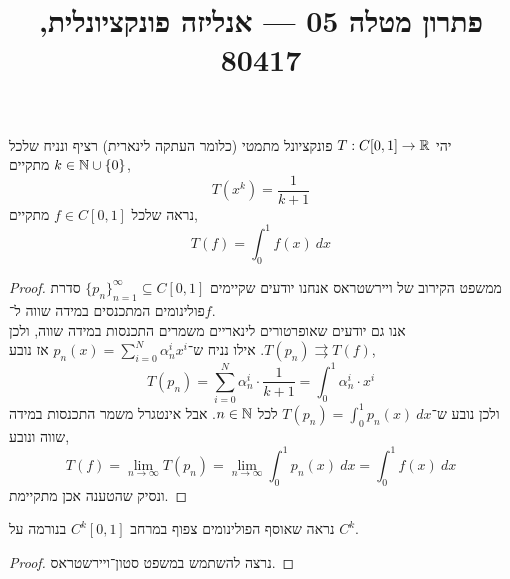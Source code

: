 
\title{פתרון מטלה 05 --- אנליזה פונקציונלית, 80417}


\maketitle
\maketitleprint[teal]

\question{}
יהי $T : C[0, 1] \to \mathbb{R}$ פונקציונל מתמטי (כלומר העתקה לינארית) רציף ונניח שלכל $k \in \mathbb{N} \cup \{ 0 \}$ מתקיים,
\[
	T(x^k)
	= \frac{1}{k + 1}
\]
נראה שלכל $f \in C[0, 1]$ מתקיים,
\[
	T(f)
	= \int_{0}^{1} f(x)\ dx
\]
\begin{proof}
	ממשפט הקירוב של ויירשטראס אנחנו יודעים שקיימים ${\{ p_n \}}_{n = 1}^\infty \subseteq C[0, 1]$ סדרת פולינומים המתכנסים במידה שווה ל־$f$. \\
	אנו גם יודעים שאופרטורים לינאריים משמרים התכנסות במידה שווה, ולכן $T(p_n) \rightrightarrows T(f)$.
	אילו נניח ש־$p_n(x) = \sum_{i = 0}^N \alpha_n^i x^i$ אז נובע,
	\[
		T(p_n)
		= \sum_{i = 0}^N \alpha_n^i \cdot \frac{1}{k + 1}
		= \int_{0}^{1} \alpha_n^i \cdot x^i
	\]
	ולכן נובע ש־$T(p_n) = \int_{0}^{1} p_n(x)\ dx$ לכל $n \in \mathbb{N}$.
	אבל אינטגרל משמר התכנסות במידה שווה ונובע,
	\[
		T(f)
		= \lim_{n \to \infty} T(p_n)
		= \lim_{n \to \infty} \int_{0}^{1} p_n(x)\ dx
		= \int_{0}^{1} f(x)\ dx
	\]
	ונסיק שהטענה אכן מתקיימת.
\end{proof}

\question{}
נראה שאוסף הפולינומים צפוף במרחב $C^k[0, 1]$ בנורמה על $C^k$.
\begin{proof}
	נרצה להשתמש במשפט סטון־ויירשטראס.
\end{proof}


